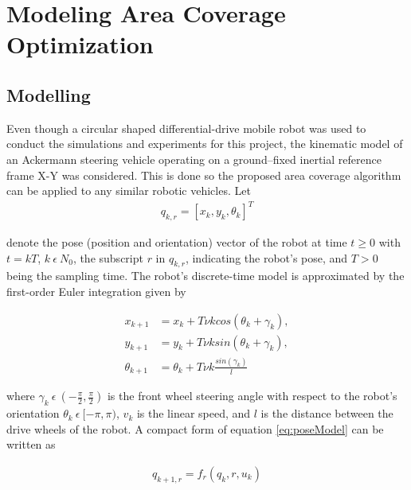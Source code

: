 \chapter{Modeling Area Coverage Optimization}
\label{chap:areaCoverageModeling}


\section{Modelling}
Even though a circular shaped differential-drive mobile robot was used to conduct the simulations and experiments for this project, the kinematic model of an Ackermann steering vehicle operating on a ground–fixed inertial reference frame X-Y was considered.  This is done so the proposed area coverage algorithm can be applied to any similar robotic vehicles.  Let 
\begin{align}
    q_{k,r} = [x_k, y_k, \theta_k]^T
\end{align}
\label{eq:poseModel}

denote the pose (position and orientation) vector of the robot at time $t\geq0$ with $t=kT$, $k~\epsilon~N_0$, the subscript $r$ in $q_{k,r}$, indicating the robot’s pose, and $T>0$ being the sampling time. The robot’s discrete-time model is approximated by the first-order Euler integration given by

\begin{subequations}
\begin{align}
    x_{k+1} &= x_k+Tνkcos(\theta_k+\gamma_k), \\
    y_{k+1} &= y_k+Tνksin(\theta_k+\gamma_k), \\
    \theta_{k+1} &= \theta_k+Tνk\frac{sin(\gamma_k)}{l}
\end{align}
\label{eq:eulerModel}
\end{subequations}

where $\gamma_k~\epsilon~(−\frac{\pi}{2},\frac{\pi}{2})$ is the front wheel steering angle with respect to the robot’s orientation $\theta_k~\epsilon~[−\pi,\pi)$, $v_k$ is the linear speed, and $l$ is the distance between the drive wheels of the robot. A compact form of equation \ref{eq:poseModel} can be written as

\begin{align}
    q_{k+1,r}=f_r(q_k,r,u_k)
\end{align}
\label{eq:compactModel}

